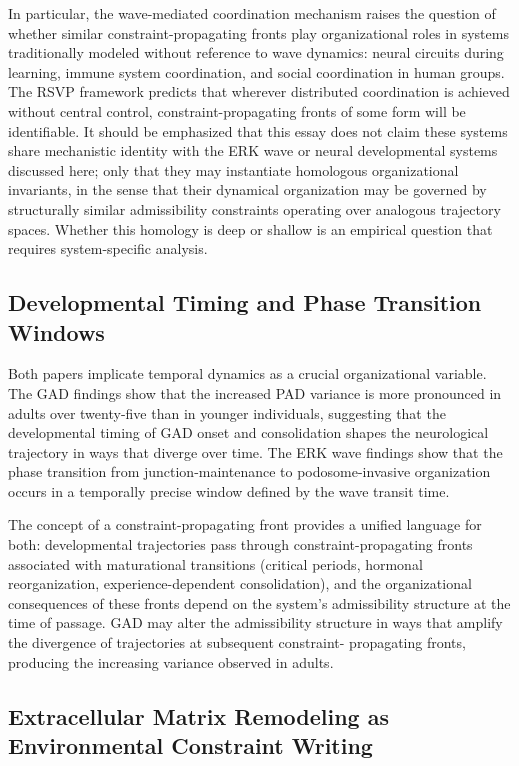 \documentclass[11pt,a4paper]{article}
\theoremstyle{plain}
\theoremstyle{definition}
\begin{document}
In particular, the wave-mediated coordination mechanism raises the question of whether
similar constraint-propagating fronts play organizational roles in systems traditionally
modeled without reference to wave dynamics: neural circuits during learning, immune
system coordination, and social coordination in human groups. The RSVP framework
predicts that wherever distributed coordination is achieved without central control,
constraint-propagating fronts of some form will be identifiable. It should be
emphasized that this essay does not claim these systems share mechanistic identity
with the ERK wave or neural developmental systems discussed here; only that they may
instantiate homologous organizational invariants, in the sense that their dynamical
organization may be governed by structurally similar admissibility constraints operating
over analogous trajectory spaces. Whether this homology is deep or shallow is an
empirical question that requires system-specific analysis.

\subsection{Developmental Timing and Phase Transition Windows}

Both papers implicate temporal dynamics as a crucial organizational variable. The GAD
findings show that the increased PAD variance is more pronounced in adults over
twenty-five than in younger individuals, suggesting that the developmental timing of
GAD onset and consolidation shapes the neurological trajectory in ways that diverge
over time. The ERK wave findings show that the phase transition from junction-maintenance
to podosome-invasive organization occurs in a temporally precise window defined by
the wave transit time.

The concept of a constraint-propagating front provides a unified language for both:
developmental trajectories pass through constraint-propagating fronts associated with
maturational transitions (critical periods, hormonal reorganization, experience-dependent
consolidation), and the organizational consequences of these fronts depend on the
system's admissibility structure at the time of passage. GAD may alter the admissibility
structure in ways that amplify the divergence of trajectories at subsequent constraint-
propagating fronts, producing the increasing variance observed in adults.

\subsection{Extracellular Matrix Remodeling as Environmental Constraint Writing}
\end{document}
